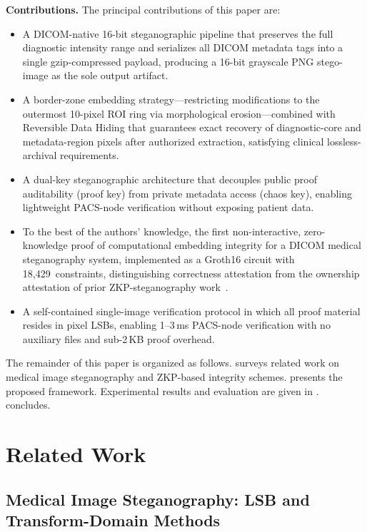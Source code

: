 \documentclass{jstarticle}
\begin{document}
\textbf{Contributions.}
The principal contributions of this paper are:
\begin{itemize}
  \item A DICOM-native 16-bit steganographic pipeline that preserves the full diagnostic intensity range and serializes all DICOM metadata tags into a single gzip-compressed payload, producing a 16-bit grayscale PNG stego-image as the sole output artifact.

  \item A border-zone embedding strategy---restricting modifications to the outermost 10-pixel ROI ring via morphological erosion---combined with Reversible Data Hiding that guarantees exact recovery of diagnostic-core and metadata-region pixels after authorized extraction, satisfying clinical lossless-archival requirements.

  \item A dual-key steganographic architecture that decouples public proof auditability (proof key) from private metadata access (chaos key), enabling lightweight PACS-node verification without exposing patient data.

  \item To the best of the authors' knowledge, the first non-interactive, zero-knowledge proof of computational embedding integrity for a DICOM medical steganography system, implemented as a Groth16 circuit with 18,429~constraints, distinguishing correctness attestation from the ownership attestation of prior ZKP-steganography work~\cite{b6}.

  \item A self-contained single-image verification protocol in which all proof material resides in pixel LSBs, enabling 1--3\,ms PACS-node verification with no auxiliary files and sub-2\,KB proof overhead.
\end{itemize}

The remainder of this paper is organized as follows.
 surveys related work on medical image steganography and ZKP-based integrity schemes.
 presents the proposed framework.
Experimental results and evaluation are given in .
 concludes.

\section{Related Work}
\label{sec:relatedwork}

\subsection{Medical Image Steganography: LSB and Transform-Domain Methods}
\end{document}
